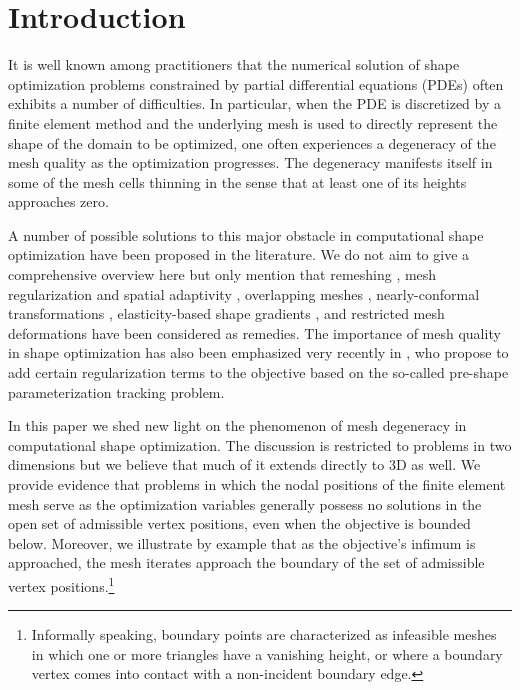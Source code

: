 \section{Introduction}
\label{section:introduction}

It is well known among practitioners that the numerical solution of shape optimization problems constrained by partial differential equations (PDEs) often exhibits a number of difficulties.
In particular, when the PDE is discretized by a finite element method and the underlying mesh is used to directly represent the shape of the domain to be optimized, one often experiences a degeneracy of the mesh quality as the optimization progresses.
The degeneracy manifests itself in some of the mesh cells thinning in the sense that at least one of its heights approaches zero.

A number of possible solutions to this major obstacle in computational shape optimization have been proposed in the literature.
We do not aim to give a comprehensive overview here but only mention that remeshing \cite{WilkeKokGroenwold:2005:1}, mesh regularization and spatial adaptivity \cite{DoganMorinNochettoVerani:2007:1,MorinNochettoPaulettiVerani:2012:1}, overlapping meshes \cite{DokkenFunkeJohanssonSchmidt:2019:1}, nearly-conformal transformations \cite{IglesiasSturmWechsung:2018:1}, elasticity-based shape gradients \cite{SchulzSiebenbornWelker:2016:1}, and restricted mesh deformations \cite{EtlingHerzogLoayzaWachsmuth:2020:1} have been considered as remedies.
The importance of mesh quality in shape optimization has also been emphasized very recently in \cite{LuftSchulz:2021:2,LuftSchulz:2021:3}, who propose to add certain regularization terms to the objective based on the so-called pre-shape parameterization tracking problem.

In this paper we shed new light on the phenomenon of mesh degeneracy in computational shape optimization.
The discussion is restricted to problems in two dimensions but we believe that much of it extends directly to 3D as well.
We provide evidence that problems in which the nodal positions of the finite element mesh serve as the optimization variables generally possess no solutions in the open set of admissible vertex positions, even when the objective is bounded below.
Moreover, we illustrate by example that as the objective's infimum is approached, the mesh iterates approach the boundary of the set of admissible vertex positions.\footnote{Informally speaking, boundary points are characterized as infeasible meshes in which one or more triangles have a vanishing height, or where a boundary vertex comes into contact with a non-incident boundary edge.}

